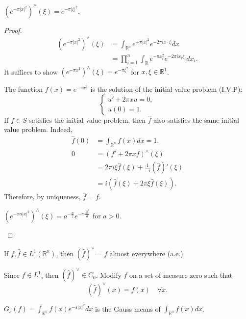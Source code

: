 \begin{lemma}
 $\left(e^{-\pi|x|^2}\right)^{\wedge}(\xi) = e^{-\pi|\xi|^2}$.
\end{lemma}
\begin{proof}
$$
    \begin{aligned}
\left(e^{-\pi|x|^2}\right)^{\wedge}(\xi) &= \int_{\mathbb{R}^n} e^{-\pi|x|^2} e^{-2 \pi i x \cdot \xi} dx \\
&= \prod_{i=1}^n \int_{\mathbb{R}} e^{-\pi x_i^2} e^{-2 \pi i x_i \xi_i} dx_i.
\end{aligned}
$$
It suffices to show $\left(e^{-\pi x^2}\right)^{\wedge}(\xi) = e^{-\pi \xi^2}$ for $x, \xi \in \mathbb{R}^1$.

The function $f(x) = e^{-\pi x^2}$ is the solution of the initial value problem (I.V.P):
$$
\begin{cases}
u' + 2\pi x u = 0, \\
u(0) = 1.
\end{cases}
$$
If $f \in S$ satisfies the initial value problem, then $\hat{f}$ also satisfies the same initial value problem. Indeed,
$$
\begin{aligned}
\hat{f}(0) &= \int_{\mathbb{R}^n} f(x) dx = 1, \\
0 &= \left(f' + 2\pi x f\right)^{\wedge}(\xi) \\
&= 2\pi i \xi \hat{f}(\xi) + \frac{1}{-i}(\hat{f})'(\xi) \\
&= i(\hat{f}(\xi) + 2\pi \xi \hat{f}(\xi)).
\end{aligned}
$$
Therefore, by uniqueness, $\hat{f} = f$.

\begin{rmk}
    $\left(e^{-\pi a|x|^2}\right)^{\wedge}(\xi) = a^{-\frac{n}{2}} e^{-\pi \frac{|\xi|^2}{a}}$ for $a > 0$.
\end{rmk} 
\end{proof}
\begin{theorem}\label{thm2.1}
    If $f, \hat{f} \in L^1\left(\mathbb{R}^n\right)$, then $(\hat{f})^\vee = f$ almost everywhere (a.e.).

\end{theorem}
\begin{rmk}
    Since $\hat{f} \in L^{1}$, then $(\hat{f})^\vee \in C_0$. Modify $f$ on a set of measure zero such that
$$
(\hat{f})^\vee(x) = f(x) \quad \forall x.
$$
\end{rmk} 
\begin{definition}
    $G_{\varepsilon}(f) = \int_{\mathbb{R}^n} f(x) e^{-\varepsilon|x|^2} dx$ is the Gauss means of $\int_{\mathbb{R}^n} f(x) dx$.
\end{definition}
